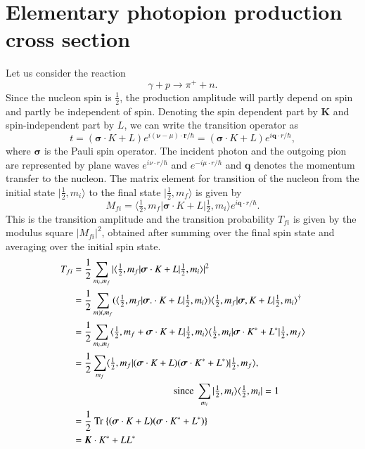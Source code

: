 \section{Elementary photopion production cross section}\label{chap3-sec4}

Let us consider the reaction
$$
\gamma + p \to \pi^+ + n.
$$
Since the nucleon spin is $\frac{1}{2}$, the production amplitude will partly depend on spin and partly be independent of spin. Denoting the spin dependent part by ${\boldsymbol  K}$ and spin-independent part by $L$, we can write the transition operator as
\setcounter{equation}{30}
\begin{equation}
t= ({\boldsymbol  \sigma \cdot K} + L) e^{i(\boldsymbol  \nu- \mu)\cdot {\boldsymbol  r}/\hbar}= ({\boldsymbol  \sigma \cdot K} + L) e^{i {\boldsymbol  q \cdot r}/\hbar}, \label{chap3-eq31}
\end{equation}
where $\boldsymbol{\sigma}$ is the Pauli spin operator. The incident photon and the outgoing pion are represented by plane waves $e^{i\nu  \cdot r/\hbar}$ and $e^{-i \mu \cdot r /\hbar}$ and ${\boldsymbol  q}$ denotes the momentum transfer to the nucleon. The matrix element for transition of the nucleon from the initial state $|\frac{1}{2}, m_i \rangle$ to the final state $|\frac{1}{2}, m_f \rangle$ is given by
\begin{equation}
  M_{fi} = \langle \tfrac{1}{2}, m_f | {\boldsymbol  \sigma \cdot K} + L | \tfrac{1}{2}, m_i \rangle e^{i {\boldsymbol  q \cdot r}/\hbar}. \label{chap3-eq32}
\end{equation}
This is the transition amplitude and the transition probability $T_{fi}$ is given by the modulus square $|M_{fi}|^2$, obtained after summing over the final spin state and averaging over the initial spin state.
\begin{align}
  T_{fi} & = \frac{1}{2} \sum_{m_i, m_f} | \langle \tfrac{1}{2}, m_f | {\boldsymbol  \sigma \cdot K} + L | \tfrac{1}{2}, m_i\rangle|^2 \notag \\
  & = \frac{1}{2} \sum_{m)i, m_f} (\langle \tfrac{1}{2}, m_f | {\boldsymbol  \sigma. \cdot K + L}| \tfrac{1}{2}, m_i \rangle) \langle \tfrac{1}{2}, m_f | {\boldsymbol  \sigma, K + L}| \tfrac{1}{2}, m_i \rangle^\dagger \notag\\
  & = \frac{1}{2} \sum_{m_i, m_f} \langle \tfrac{1}{2}, m_f + {\boldsymbol  \sigma \cdot K} + L | \tfrac{1}{2}, m_i \rangle \langle \tfrac{1}{2} , m_i | {\boldsymbol  \sigma \cdot K^\ast}+ L^\ast| \tfrac{1}{2}, m_f \rangle \notag\\
  & = \frac{1}{2} \sum_{m_f} \langle \tfrac{1}{2}, m_f | ({\boldsymbol  \sigma \cdot K} + L) ({\boldsymbol  \sigma \cdot K^\ast} + L^\ast) | \tfrac{1}{2}, m_f \rangle,\notag\\
  & \qquad \qquad \qquad \qquad \qquad ~\text{since}~ \sum_{m_i} |\tfrac{1}{2}, m_i \rangle \langle \tfrac{1}{2}, m_i| =1 \notag\\
  & = \frac{1}{2} ~\text{Tr}~  \{ ({\boldsymbol  \sigma \cdot K}+L)({\boldsymbol  \sigma \cdot K^\ast}
  + L^\ast)\}\notag \\
  & = {\boldsymbol  K \cdot K^\ast} + LL^\ast \label{chap3-eq33}
\end{align}
